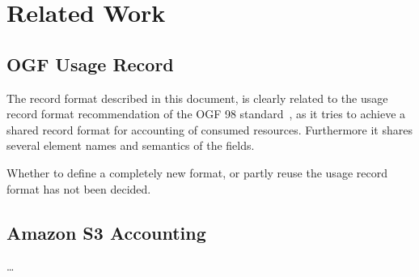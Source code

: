 \section{Related Work}


\subsection{OGF Usage Record}

The record format described in this document, is clearly related to the usage
record format recommendation of the OGF 98 standard~\cite{ogf98ur}, as it tries
to achieve a shared record format for accounting of consumed resources.
Furthermore it shares several element names and semantics of the fields.

Whether to define a completely new format, or partly reuse the usage record
format has not been decided.


\subsection{Amazon S3 Accounting}

\ldots

